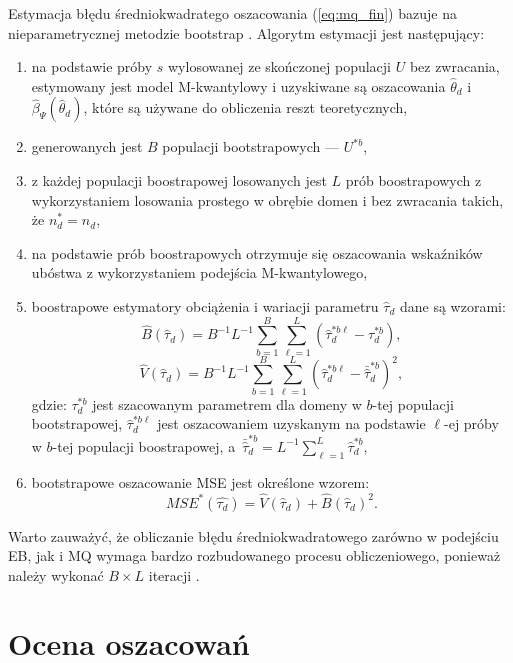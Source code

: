 Estymacja błędu średniokwadratego oszacowania (\ref{eq:mq_fin}) bazuje na nieparametrycznej metodzie bootstrap \citep{marchetti2012}. Algorytm estymacji jest następujący:

\begin{enumerate}
\item na podstawie próby $s$ wylosowanej ze skończonej populacji $U$ bez zwracania, estymowany jest model M-kwantylowy i uzyskiwane są oszacowania $\hat{\theta}_d$ i $\hat{\beta}_\Psi(\hat{\theta}_d)$, które są używane do obliczenia reszt teoretycznych,
\item generowanych jest $B$ populacji bootstrapowych --- $U^{*b}$,
\item z każdej populacji boostrapowej losowanych jest $L$ prób boostrapowych z wykorzystaniem losowania prostego w obrębie domen i bez zwracania takich, że $n^*_d=n_d$,
\item na podstawie prób boostrapowych otrzymuje się oszacowania wskaźników ubóstwa z wykorzystaniem podejścia M-kwantylowego,
\item boostrapowe estymatory obciążenia i wariacji parametru $\hat{\tau}_d$ dane są wzorami:
\begin{equation}
\hat{B}(\hat{\tau}_d)=B^{-1}L^{-1}\sum\limits_{b=1}^{B}\sum\limits_{\ell=1}^{L}{(\hat{\tau}_d^{*b\ell}-\tau_d^{*b})},
\end{equation}
\begin{equation}
\hat{V}(\hat{\tau}_d)=B^{-1}L^{-1}\sum\limits_{b=1}^{B}\sum\limits_{\ell=1}^{L}{(\hat{\tau}_d^{*b\ell}-\bar{\hat{\tau}}_d^{*b})^2},
\end{equation}
gdzie: $\tau^{*b}_d$ jest szacowanym parametrem dla domeny w $b$-tej populacji bootstrapowej, $\hat{\tau}_d^{*b\ell}$ jest oszacowaniem uzyskanym na podstawie $\ell$-ej próby w $b$-tej populacji boostrapowej, a~$\bar{\hat{\tau}}_d^{*b}=L^{-1}\sum\limits_{\ell=1}^{L}{\hat{\tau}_d^{*b}}$,
\item bootstrapowe oszacowanie MSE jest określone wzorem:
\begin{equation}
MSE^*(\hat{\tau_d})=\hat{V}(\hat{\tau}_d)+\hat{B}(\hat{\tau}_d)^2.
\end{equation}
\end{enumerate}

Warto zauważyć, że obliczanie błędu średniokwadratowego zarówno w podejściu EB, jak i MQ wymaga bardzo rozbudowanego procesu obliczeniowego, ponieważ należy wykonać $B \times L$ iteracji \citep{zadlo2015}.

\section{Ocena oszacowań}


